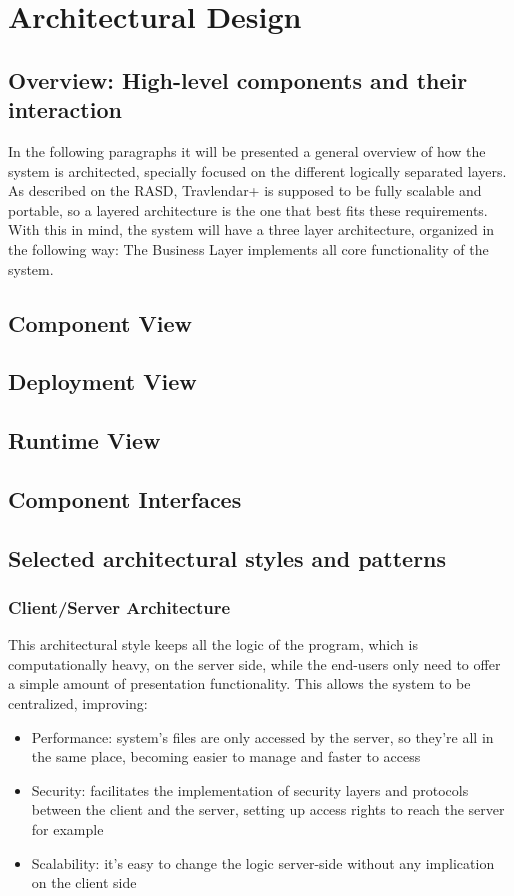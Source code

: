 \documentclass[12pt]{article}
\begin{document}
\section{Architectural Design}

\subsection{Overview: High-level components and their interaction}
In the following paragraphs it will be presented a general overview of how the system is architected, specially focused on the different logically separated layers.
As described on the RASD, Travlendar+ is supposed to be fully scalable and portable, so a layered architecture is the one that best fits these requirements. With this in mind, the system will have a three layer architecture, organized in the following way:
The Business Layer implements all core functionality of the system.
\subsection{Component View}
\subsection{Deployment View}
\subsection{Runtime View}
\subsection{Component Interfaces}
\subsection{Selected architectural styles and patterns}

\subsubsection{Client/Server Architecture} This architectural style keeps all the logic of the program, which is computationally heavy, on the server side, while the end-users only need to offer a simple amount of presentation functionality. This allows the system to be centralized, improving:
    \begin{itemize}
        \item Performance: system's files are only accessed by the server, so they're all in the same place, becoming easier to manage and faster to access
        \item Security: facilitates the implementation of security layers and protocols between the client and the server, setting up access rights to reach the server for example
        \item Scalability: it's easy to change the logic server-side without any implication on the client side
    \end{itemize}
\end{document}
